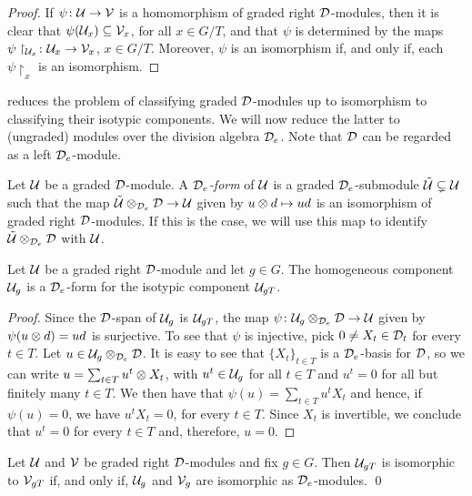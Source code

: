 \begin{proof}
    If $\psi\colon \mathcal U \to \mathcal V$ is a homomorphism of graded right $\mathcal{D}$-modules, then it is clear that $\psi (\mathcal U_x) \subseteq \mathcal V_x$, for all $x \in G/T$, and that $\psi$ is determined by the maps $\psi\restriction_{\mathcal U_x} \colon \mathcal U_x \to \mathcal V_x$, $x \in G/T$. 
    Moreover, $\psi$ is an isomorphism if, and only if, each $\psi\restriction_x$ is an isomorphism.
\end{proof}

 reduces the problem of classifying graded $\mathcal{D}$-modules up to isomorphism to classifying their isotypic components. 
We will now reduce the latter to (ungraded) modules over the division algebra $\mathcal{D}_e$. 
Note that $\mathcal{D}$ can be regarded as a left $\mathcal{D}_e$-module.

\begin{defi}\label{def:D_e-form}
    Let $\mathcal U$ be a graded $\mathcal{D}$-module. 
    A \emph{$\mathcal{D}_e$-form} of $\mathcal U$ is a graded $\mathcal{D}_e$-submodule $\tilde {\mathcal U} \subsetneq \mathcal U$ such that the map $\tilde {\mathcal U} \otimes_{\mathcal{D}_e} \mathcal{D} \to \mathcal U$ given by $u\otimes d \mapsto ud$ is an isomorphism of graded right $\mathcal{D}$-modules. 
    If this is the case, we will use this map to identify $\tilde {\mathcal U} \otimes_{\mathcal{D}_e} \mathcal{D}$ with $\mathcal U$. 
\end{defi}

\begin{prop}\label{prop:U_g-is-D_e-form}
    Let $\mathcal U$ be a graded right $\mathcal{D}$-module and let $g\in G$. 
    The homogeneous component $\mathcal U_g$ is a $\mathcal{D}_e$-form for the isotypic component $\mathcal U_{gT}$.
\end{prop}

\begin{proof}
    Since the $\mathcal{D}$-span of $\mathcal U_g$ is $\mathcal U_{gT}$, the map $\psi\colon \mathcal U_g \otimes_{\mathcal{D}_e} \mathcal{D} \to \mathcal U$ given by $\psi (u\otimes d) = ud$ is surjective. 
    To see that $\psi$ is injective, pick $0 \neq X_t \in \mathcal{D}_t$ for every $t\in T$. 
    Let $u \in \mathcal U_g \otimes_{\mathcal{D}_e} \mathcal{D}$. 
    It is easy to see that $\{ X_t\}_{t\in T}$ is a $\mathcal{D}_e$-basis for $\mathcal{D}$, so we can write $u = \sum_{t\in T} u^t \otimes X_t$, with $u^t \in \mathcal U_g$ for all $t\in T$ and $u^t = 0$ for all but finitely many $t\in T$. 
    We then have that $\psi (u) = \sum_{t\in T} u^t X_t$ and
    hence, if $\psi (u) = 0$, we have $u^t X_t = 0$, for every $t \in T$. 
    Since $X_t$ is invertible, we conclude that $u^t = 0$ for every $t\in T$ and, therefore, $u = 0$.
\end{proof}

\begin{cor}\label{cor:iso-isotypic-components}
    Let $\mathcal U$ and $\mathcal V$ be graded right $\mathcal{D}$-modules and fix $g\in G$. 
    Then $\mathcal U_{gT}$ is isomorphic to $\mathcal V_{gT}$ if, and only if, $\mathcal U_g$ and $\mathcal V_g$ are isomorphic as $\mathcal{D}_e$-modules. \qed
\end{cor}

